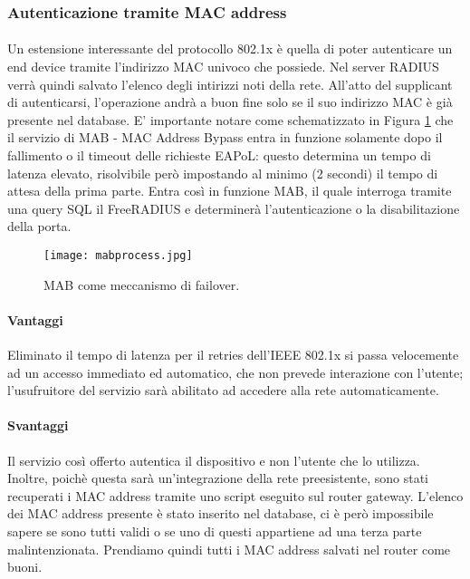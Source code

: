\subsubsection{Autenticazione tramite MAC address}
\paragraph{} Un estensione interessante del protocollo 802.1x è quella di poter autenticare un end device tramite l'indirizzo MAC univoco che possiede. Nel server RADIUS verrà quindi salvato l'elenco degli intirizzi noti della rete. All'atto del supplicant di autenticarsi, l'operazione andrà a buon fine solo se il suo indirizzo MAC è già presente nel database. E' importante notare come schematizzato in Figura \ref{fig:mab} che il servizio di MAB - MAC Address Bypass entra in funzione solamente dopo il fallimento o il timeout delle richieste EAPoL: questo determina un tempo di latenza elevato, risolvibile però impostando al minimo (2 secondi) il tempo di attesa della prima parte. Entra così in funzione MAB, il quale interroga tramite una query SQL il FreeRADIUS e determinerà l'autenticazione o la disabilitazione della porta. 

\begin{figure}[h]
  \texttt{[image: mabprocess.jpg]}
  \caption{MAB come meccanismo di failover.}
  \label{fig:mab}
\end{figure}

\paragraph{Vantaggi} Eliminato il tempo di latenza per il retries dell'IEEE 802.1x si passa velocemente ad un accesso immediato ed automatico, che non prevede interazione con l'utente; l'usufruitore del servizio sarà abilitato ad accedere alla rete automaticamente. 
\paragraph{Svantaggi} Il servizio così offerto autentica il dispositivo e non l'utente che lo utilizza. Inoltre, poichè questa sarà un'integrazione della rete preesistente, sono stati recuperati i MAC address tramite uno script eseguito sul router gateway. L'elenco dei MAC address presente è stato inserito nel database, ci è però impossibile sapere se sono tutti validi o se uno di questi appartiene ad una terza parte malintenzionata. Prendiamo quindi tutti i MAC address salvati nel router come buoni.





